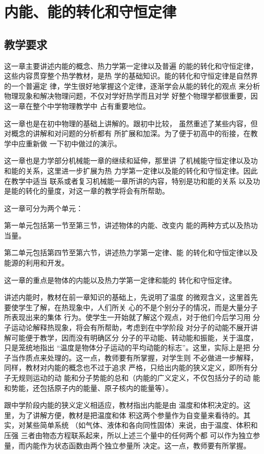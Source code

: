 \chapter{内能、能的转化和守恒定律}
\minitoc[n]
\section{教学要求}
这一章主要讲述内能的概念、热力学第一定律以及普遍
的能的转化和守恒定律，这些内容贯穿整个热学教材，是热
学的基础知识。能的转化和守恒定律是自然界的一个普遍定
律，学生很好地掌握这个定律，逐渐学会从能的转化的观点
来分析物理现象和解决物理问题，不仅对学好热学而且对学
好整个物理学都很重要，因这一章在整个中学物理教学中
占有重要地位。

这一章也是在初中物理的基础上讲解的。跟初中比较，
虽然重述了某些内容，但对概念的讲解和对问题的分析都有
所扩展和加深。为了便于初高中的衔接，在教学中应重新做
一下初中做过的演示。

这一章也是力学部分机械能一章的继续和延伸，那里讲
了机械能守恒定律以及功和能的关系，这里进一步扩展为热
力学第一定律以及能的转化和守恒定律。因此在教学中适当
联系或者复习机械能一章所讲的内容，特别是功和能的关系
以及功是能的转化的量度，对这一章的教学将会有所帮助。

这一章可分为两个单元：

第一单元包括第一节至第三节，讲述物体的内能、改变内
能的两种方式以及热功当量。

第二单元包括第四节至第六节，讲述热力学第一定律、能
的转化和守恒定律以及能源的利用和开发。

这一章的重点是物体的内能以及热力学第一定律和能的
转化和守恒定律。

讲述内能时，教材在前一章知识的基础上，先说明了温度
的微观含义，这里首先要使学生了解，在热现象中，人们所关
心的不是个别分子的情况，而是大量分子所表现出来的集体
行为。使学生一开始就了解这个观点，对于他们今后学习用
分子运动论解释热现象，将会有所帮助，考虑到在中学阶段
对分子的动能不展开讲解可能便于教学，因而没有明确区分
分子的平动能、转动能和振能，关于温度，只是笼统地指出
“温度是物体分子运动的平均动能的标志”。这里，实际上是把
分子当作质点来处理的。这一点，教师要有所掌握，对学生则
不必做进一步解释，同样，教材对内能的概念也不过于追求
严格，只给出内能的狭义定义，即所有分子无规则运动的动
能和分子势能的总和（内能的广义定义，不仅包括分子的动
能和势能，还包括原子内的能量、原子核内的能量等）。

跟中学阶段内能的狭义定义相适应，教材指出内能是由
温度和体积决定的。这里，为了讲解方便，教材是把温度和体
积这两个参量作为自变量来看待的。其实，对某些简单系统
（如气体、液体和各向同性固体）来说，由于温度、体积和压强
三者由物态方程联系起来，所以上述三个量中的任何两个都
可以作为独立参量，而内能作为状态函数由两个独立参量所
决定。这一点，教师要有所掌握。

